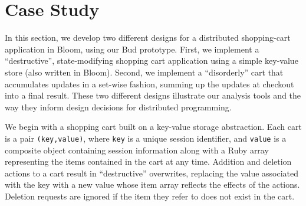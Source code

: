 \section{Case Study}
\label{sec:case}

In this section, we develop two different designs for a distributed shopping-cart
application in Bloom, using our Bud prototype.  First, we implement a ``destructive'', state-modifying
shopping cart application using a simple key-value store (also written in Bloom).
Second, we implement a ``disorderly'' cart that accumulates updates in a 
set-wise fashion, summing up the updates at checkout into a final result.  These two different designs illustrate our analysis tools and the way they inform design decisions for distributed programming.

We begin with a shopping cart built on a key-value storage abstraction.  Each
cart is a pair \texttt{(key,value)}, where \texttt{key} is a unique session
identifier, and \texttt{value} is a composite object containing session information along with a Ruby array representing the items contained in the cart at any time.  Addition and deletion actions to a cart
result in ``destructive'' overwrites, replacing the value associated with the
key with a new value whose item array reflects the effects of the actions.  Deletion requests are ignored if the item they refer to does not exist in the cart. 

